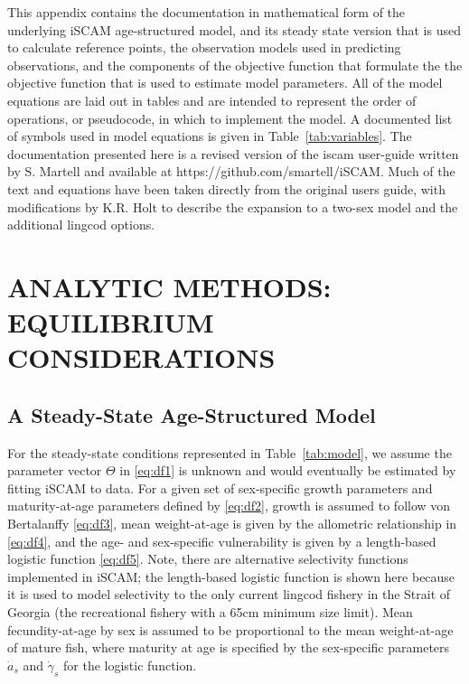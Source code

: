 This appendix contains the documentation in mathematical form of the underlying iSCAM age-structured model, and its steady state version that is used to calculate reference points, the observation models used in predicting observations, and the components of the objective function that formulate the the objective function that is used to estimate model parameters.  All of the model equations are laid out in tables and are intended to represent the order of operations, or pseudocode, in which to implement the model.  A documented list of symbols used in model equations is given in Table~\ref{tab:variables}. The documentation presented here is a revised version of the iscam user-guide written by S. Martell and available at https://github.com/smartell/iSCAM.  Much of the text and equations have been taken directly from the original users guide, with modifications by K.R. Holt to describe the expansion to a two-sex model and the additional lingcod options.

\section{ANALYTIC METHODS: EQUILIBRIUM CONSIDERATIONS}

\subsection{A Steady-State Age-Structured Model}

For the steady-state conditions represented in Table~\ref{tab:model}, we assume the parameter vector $\Theta$ in \ref{eq:df1} is unknown and would eventually be estimated by fitting iSCAM to data.  For a given set of sex-specific growth parameters and maturity-at-age parameters defined by \ref{eq:df2}, growth is assumed to follow von Bertalanffy \ref{eq:df3}, mean weight-at-age is given by the allometric relationship in \ref{eq:df4}, and the age- and sex-specific vulnerability is given by a length-based logistic function \ref{eq:df5}. Note, there are alternative selectivity functions implemented in iSCAM; the length-based logistic function is shown here because it is used to model selectivity to the only current lingcod fishery in the Strait of Georgia (the recreational fishery with a 65cm minimum size limit). Mean fecundity-at-age by sex is assumed to be proportional to the mean weight-at-age of mature fish, where maturity at age is specified by the sex-specific parameters $\dot{a}_s$ and $\dot{\gamma}_s$ for the logistic function.

